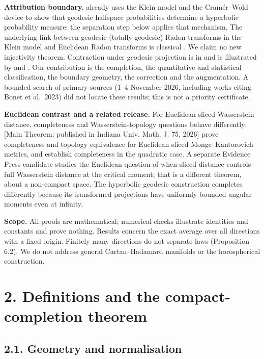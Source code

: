 \documentclass[
  british,
  11pt,
  a4paper,
]{article}
\begin{document}
\textbf{Attribution boundary.} \citet[Section 2]{Lyons2014} already uses
the Klein model and the Cramér--Wold device to show that geodesic
halfspace probabilities determine a hyperbolic probability measure; the
separation step below applies that mechanism. The underlying link
between geodesic (totally geodesic) Radon transforms in the Klein model
and Euclidean Radon transforms is classical \citep{Helgason2011}. We
claim no new injectivity theorem. Contraction under geodesic projection
is in \citet[Proposition 3.5]{Chami2021} and is illustrated by
\citet[Figure 3]{Bonet2023} and \citet[Figure 1]{Li2025}. Our
contribution is the completion, the quantitative and statistical
classification, the boundary geometry, the correction and the
augmentation. A bounded search of primary sources (1--4 November 2026,
including works citing Bonet et al.~2023) did not locate these results;
this is not a priority certificate.

\textbf{Euclidean contrast and a related release.} For Euclidean sliced
Wasserstein distance, completeness and Wasserstein-topology questions
behave differently: \citet{KT2026} {[}Main Theorem; published in Indiana
Univ. Math. J. 75, 2026{]} prove completeness and topology equivalence
for Euclidean sliced Monge--Kantorovich metrics, and \citet[Proposition
2.4]{PS2025} establish completeness in the quadratic case. A separate
Evidence Press candidate \citep{EPnoninteger2026} studies the Euclidean
question of when sliced distance controls full Wasserstein distance at
the critical moment; that is a different theorem, about a non-compact
space. The hyperbolic geodesic construction completes differently
because its transformed projections have uniformly bounded angular
moments even at infinity.

\textbf{Scope.} All proofs are mathematical; numerical checks illustrate
identities and constants and prove nothing. Results concern the exact
average over all directions with a fixed origin. Finitely many
directions do not separate laws (Proposition 6.2). We do not address
general Cartan--Hadamard manifolds or the horospherical construction.

\section{2. Definitions and the compact-completion
theorem}\label{definitions-and-the-compact-completion-theorem}

\subsection{2.1. Geometry and
normalisation}\label{geometry-and-normalisation}
\end{document}

